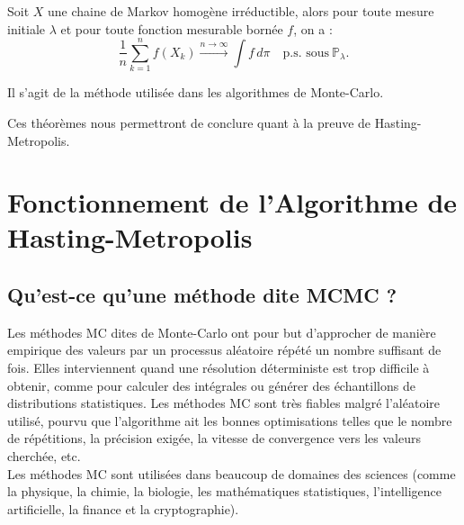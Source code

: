 \documentclass{article}
\begin{document}
\begin{tcolorbox}[colback=white,colframe=blue!80!black,title=Convergence des méthodes de Monte-Carlo]
Soit $X$ une chaine de Markov homogène irréductible, alors pour toute mesure initiale $\lambda$ et pour toute fonction mesurable bornée $f$, on a :
\[
\frac{1}{n} \sum_{k=1}^{n} f(X_k) \xrightarrow{n \to \infty} \int f \, d\pi \quad \text{p.s. sous} \ \mathbb{P}_\lambda.
\]

Il s'agit de la méthode utilisée dans les algorithmes de Monte-Carlo.
\end{tcolorbox}
  
Ces théorèmes nous permettront de conclure quant à la preuve de Hasting-Metropolis.

\newpage
\section{Fonctionnement de l'Algorithme de Hasting-Metropolis}

\subsection{Qu'est-ce qu'une méthode dite MCMC ?}

Les méthodes MC dites de Monte-Carlo ont pour but d'approcher de manière empirique des valeurs par un processus aléatoire répété un nombre suffisant de fois. Elles interviennent quand une résolution déterministe est trop difficile à obtenir, comme pour calculer des intégrales ou générer des échantillons de distributions statistiques. Les méthodes MC sont très fiables malgré l'aléatoire utilisé, pourvu que l'algorithme ait les bonnes optimisations telles que le nombre de répétitions, la précision exigée, la vitesse de convergence vers les valeurs cherchée, etc. \\
Les méthodes MC sont utilisées dans beaucoup de domaines des sciences (comme la physique, la chimie, la biologie, les mathématiques statistiques, l'intelligence artificielle, la finance et la cryptographie). \\
\end{document}
